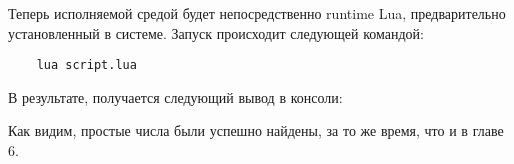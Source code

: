 Теперь исполняемой средой будет непосредственно runtime Lua, предварительно установленный в системе. Запуск происходит следующей командой:
\begin{lstlisting}
	lua script.lua
\end{lstlisting}

В результате, получается следующий вывод в консоли:

Как видим, простые числа были успешно найдены, за то же время, что и в главе 6.
\clearpage